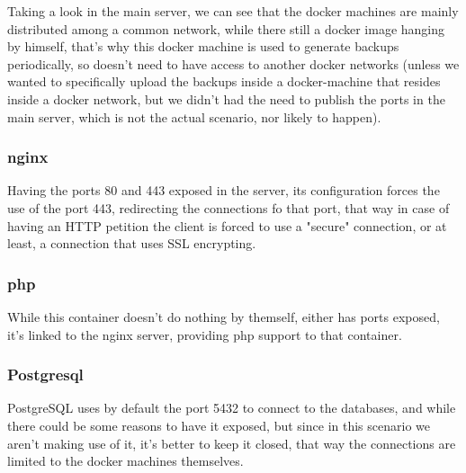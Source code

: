 \documentclass[11pt]{article}
\begin{document}
    \begin{flushleft}
        Taking a look in the main server, we can see that the docker machines are mainly distributed among a common network,
        while there still a docker image hanging by himself, that's why this docker machine is used to generate backups
        periodically, so doesn't need to have access to another docker networks (unless we wanted to specifically upload
        the backups inside a docker-machine that resides inside a docker network, but we didn't had the need
        to publish the ports in the main server, which is not the actual scenario, nor likely to happen).
    \end{flushleft}

    \subsubsection[Nginx]{nginx}
    \begin{flushleft}
        Having the ports 80 and 443 exposed in the server, its configuration forces the use of the port 443, redirecting
        the connections fo that port, that way in case of having an HTTP petition the client is forced to use a "secure"
        connection, or at least, a connection that uses SSL encrypting.
    \end{flushleft}

    \subsubsection[PHP]{php}
    \begin{flushleft}
        While this container doesn't do nothing by themself, either has ports exposed, it's linked to the nginx server, providing php support
        to that container.
    \end{flushleft}

    \subsubsection[Postgresql]{Postgresql}
    \begin{flushleft}
        PostgreSQL uses by default the port 5432 to connect to the databases, and while there could be some reasons to
        have it exposed, but since in this scenario we aren't making use of it, it's better to keep it closed, that way
        the connections are limited to the docker machines themselves.
    \end{flushleft}
    \newpage
\end{document}
